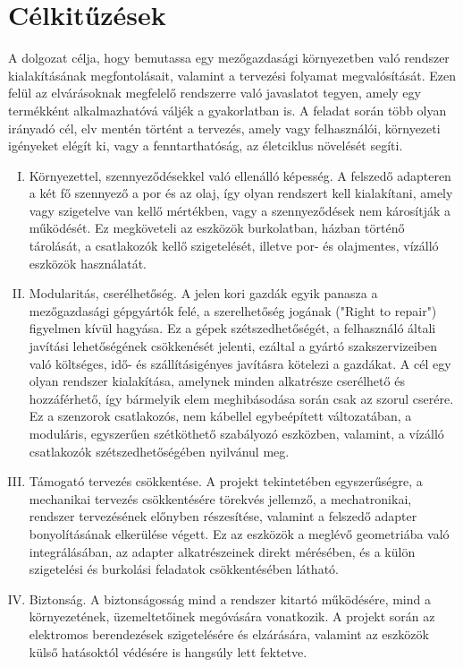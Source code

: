 \section{Célkitűzések}

A dolgozat célja, hogy bemutassa egy mezőgazdasági környezetben való rendszer kialakításának megfontolásait, valamint a tervezési folyamat megvalósítását. Ezen felül az elvárásoknak megfelelő rendszerre való javaslatot tegyen, amely egy termékként alkalmazhatóvá váljék a gyakorlatban is.
A feladat során több olyan irányadó cél, elv mentén történt a tervezés, amely vagy felhasználói, környezeti igényeket elégít ki, vagy a fenntarthatóság, az életciklus növelését segíti.
\begin{enumerate}[I.]
	\item Környezettel, szennyeződésekkel való ellenálló képesség. A felszedő adapteren a két fő szennyező a por és az olaj, így olyan rendszert kell kialakítani, amely vagy szigetelve van kellő mértékben, vagy a szennyeződések nem károsítják a működését. Ez megköveteli az eszközök burkolatban, házban történő tárolását, a csatlakozók kellő szigetelését, illetve por- és olajmentes, vízálló eszközök használatát.
	\item Modularitás, cserélhetőség. A jelen kori gazdák egyik panasza a mezőgazdasági gépgyártók felé, a szerelhetőség jogának ("Right to repair") figyelmen kívül hagyása. Ez a gépek szétszedhetőségét, a felhasználó általi javítási lehetőségének csökkenését jelenti, ezáltal a gyártó szakszervizeiben való költséges, idő- és szállításigényes javításra kötelezi a gazdákat. A cél egy olyan rendszer kialakítása, amelynek minden alkatrésze cserélhető és hozzáférhető, így bármelyik elem meghibásodása során csak az szorul cserére. Ez a szenzorok csatlakozós, nem kábellel egybeépített változatában, a moduláris, egyszerűen szétköthető szabályozó eszközben, valamint, a vízálló csatlakozók szétszedhetőségében nyilvánul meg.
	\item Támogató tervezés csökkentése. A projekt tekintetében egyszerűségre, a mechanikai tervezés csökkentésére törekvés jellemző, a mechatronikai, rendszer tervezésének előnyben részesítése, valamint a felszedő adapter bonyolításának elkerülése végett. Ez az eszközök a meglévő geometriába való integrálásában, az adapter alkatrészeinek direkt mérésében, és a külön szigetelési és burkolási feladatok csökkentésében látható.
	\item Biztonság. A biztonságosság mind a rendszer kitartó működésére, mind a környezetének, üzemeltetőinek megóvására vonatkozik. A projekt során az elektromos berendezések szigetelésére és elzárására, valamint az eszközök külső hatásoktól védésére is hangsúly lett fektetve.
\end{enumerate}

